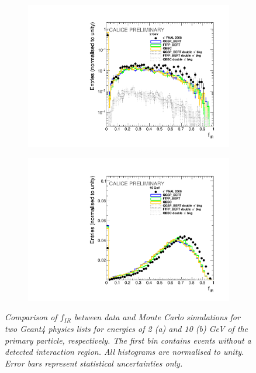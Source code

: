 \begin{figure}
	\centering
	\begin{subfigure}{0.5\textwidth}
		\centering
		\includegraphics[width=.90\linewidth]{ECAL/plots/e-ir-2.pdf}
		\caption{\label{fig:efr2} }
	\end{subfigure}%
	\begin{subfigure}{0.5\textwidth}
		\centering
		\includegraphics[width=.90\linewidth]{ECAL/plots/e-ir-10.pdf}
		\caption{\label{fig:efr10} }
	\end{subfigure}
	\caption{\label{fig:irexample} \sl%
		Comparison of $f_{IR}$ between data and Monte Carlo simulations for two {\sc Geant}4 physics lists for energies of 2 (a) and 10 (b) GeV of the primary particle, respectively. The first bin contains events without a detected interaction region. All histograms are normalised to unity. Error bars represent statistical uncertainties only.}
\end{figure}

